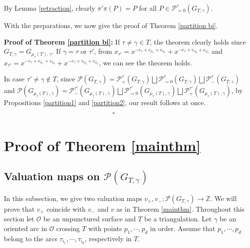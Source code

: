 \documentclass[10pt]{amsart}
\theoremstyle{theorems}
\begin{document}
\medskip

By Lemma \ref{retraction}, clearly $\pi'\pi(P)=P$ for all $P\in \mathcal P^{\tau}_{=0}(G_{T,\gamma})$.

\medskip

With the preparations, we now give the proof of Theorem \ref{partition bi}.

\medskip

{\bf Proof of Theorem \ref{partition bi}:} If $\tau\neq \gamma\in T$, the theorem clearly holds since $G_{T,\gamma}=G_{\mu_{\tau}(T),\gamma}$. If $\gamma=\tau$ or $\tau'$, from $x_{\tau'}=x^{-e_{\tau}+e_{a_1}+e_{a_3}}+x^{-e_{\tau}+e_{a_2}+e_{a_4}}$ and $x_{\tau'}=x^{-e_{\tau}+e_{a_1}+e_{a_3}}+x^{-e_{\tau}+e_{a_2}+e_{a_4}}$, we can see the theorem holds.

In case $\tau'\neq \gamma\notin T$, since $\mathcal P(G_{T,\gamma})=\mathcal P^{\tau}_{+}(G_{T,\gamma})\bigsqcup \mathcal P^{\tau}_{=0}(G_{T,\gamma})\bigsqcup\mathcal P^{\tau}_{-}(G_{T,\gamma})$ and $\mathcal P(G_{\mu_{\tau}(T),\gamma})=\mathcal P^{\tau'}_{-}(G_{\mu_{\tau}(T),\gamma})\bigsqcup \mathcal P^{\tau'}_{=0}(G_{\mu_{\tau}(T),\gamma})\bigsqcup\mathcal P^{\tau'}_{+}(G_{\mu_{\tau}(T),\gamma})$, by Propositions \ref{partition1} and \ref{partition2}, our result follows at once.
 \;\;\; \ \ \ \ \ \ \ \ \ \;\;\; \ \ \ \ \ \ \  \;\;\; \ \ \ \ \ \ \ \ \ \;\;\; \ \ \ \ \ \ \ \;\;\; \ \ \ \ \ \ \ $\square$

\medskip

\section{Proof of Theorem \ref{mainthm}}\label{main2}

\subsection{Valuation maps on \textbf{$\mathcal P(G_{T,\gamma})$}}

In this subsection, we give two valuation maps $v_{+},v_{-}: \mathcal P(G_{T,\gamma})\rightarrow \mathbb Z$. We will prove that $v_{+}$ coincide with $v_{-}$ and $v$ as in Theorem \ref{mainthm}. Throughout this section let $\mathcal O$ be an unpunctured surface and $T$ be a triangulation. Let $\gamma$ be an oriented arc in $\mathcal O$ crossing $T$ with points $p_1,\cdots, p_d$ in order. Assume that $p_1,\cdots,p_d$ belong to the arcs $\tau_{i_1},\cdots,\tau_{i_d}$, respectively in $T$.

\medskip
\end{document}
